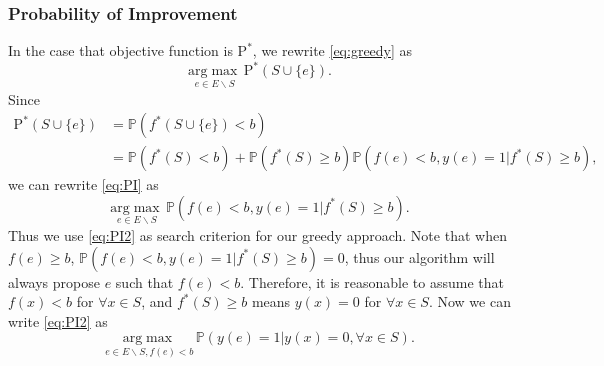 \documentclass[11pt]{article}
\newcommand{\PI}{\text{P}^*}
\begin{document}
\subsubsection{Probability of Improvement}
In the case that objective function is $\PI$, we rewrite \eqref{eq:greedy} as 
\begin{equation} \label{eq:PI}
\underset{e \in E \backslash S}{\mathrm{arg}\max} \,\PI (S \cup \{e\}).
\end{equation} 
Since
\begin{align*}
\PI(S \cup \{e\}) &= \mathbb{P}(f^*(S\cup \{e\})<b)\\
                  &= \mathbb{P}(f^*(S)<b) + \mathbb{P}(f^*(S)\geq b) \mathbb{P}(f(e)<b, y(e)=1|f^*(S)\geq b),
\end{align*}
we can rewrite \eqref{eq:PI} as
\begin{equation} \label{eq:PI2}
\underset{e \in E \backslash S}{\mathrm{arg}\max} \, \mathbb{P}(f(e)<b, y(e)=1|f^*(S)\geq b).
\end{equation}
Thus we use \eqref{eq:PI2} as search criterion for our greedy approach. Note that when $f(e) \geq b$, $\mathbb{P}(f(e)<b, y(e)=1|f^*(S)\geq b)=0$, thus our algorithm will always propose $e$ such that $f(e)<b$. Therefore, it is reasonable to assume that $f(x)<b$ for $\forall x \in S$, and $f^*(S)\geq b$ means $y(x)=0$ for $\forall x \in S$. Now we can write \eqref{eq:PI2} as 
\begin{equation} \label{eq:PI3}
\underset{e \in E \backslash S, f(e)<b}{\mathrm{arg}\max} \, \mathbb{P}(y(e)=1|y(x)=0, \forall x \in S).
\end{equation}
\end{document}
